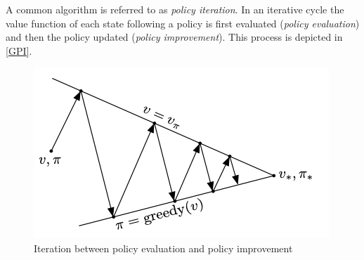 A common algorithm is referred to as \emph{policy iteration}. In an iterative cycle the value function of each state following a policy is first evaluated (\emph{policy evaluation}) and then the policy updated (\emph{policy improvement}). This process is depicted in \autoref{GPI}.

\begin{figure}[ht]
	\centering
	\includegraphics[width=.6\textwidth]{images/GPI2.png}
	\caption{\label{fig:bild2}Iteration between policy evaluation and policy improvement \autocite{Sutton2018}}
	\label{GPI}
\end{figure}
